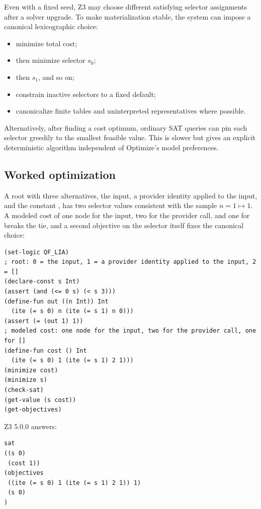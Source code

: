 \documentclass[10pt,letterpaper,oneside]{report}
\newcommand{\code}[1]{\texttt{\detokenize{#1}}}
\begin{document}
Even with a fixed seed, Z3 may choose different satisfying selector assignments after a solver upgrade. To make materialization stable, the system can impose a canonical lexicographic choice:

\begin{itemize}
\item minimize total cost;
\item then minimize selector $s_0$;
\item then $s_1$, and so on;
\item constrain inactive selectors to a fixed default;
\item canonicalize finite tables and uninterpreted representatives where possible.
\end{itemize}

Alternatively, after finding a cost optimum, ordinary SAT queries can pin each selector greedily to the smallest feasible value. This is slower but gives an explicit deterministic algorithm independent of Optimize's model preferences.
\subsection*{Worked optimization}
\label{sec:opt-worked}

A root with three alternatives, the input, a provider identity applied to the input, and the constant \code{[]}, has two selector values consistent with the sample $n=1\mapsto1$. A modeled cost of one node for the input, two for the provider call, and one for \code{[]} breaks the tie, and a second objective on the selector itself fixes the canonical choice:

\begin{lstlisting}[language=SMTLib,caption={Native Optimize with two lexicographic objectives.}]
(set-logic QF_LIA)
; root: 0 = the input, 1 = a provider identity applied to the input, 2 = []
(declare-const s Int)
(assert (and (<= 0 s) (< s 3)))
(define-fun out ((n Int)) Int
  (ite (= s 0) n (ite (= s 1) n 0)))
(assert (= (out 1) 1))
; modeled cost: one node for the input, two for the provider call, one for []
(define-fun cost () Int
  (ite (= s 0) 1 (ite (= s 1) 2 1)))
(minimize cost)
(minimize s)
(check-sat)
(get-value (s cost))
(get-objectives)
\end{lstlisting}

Z3 5.0.0 answers:

\begin{lstlisting}[language=SMTLib]
sat
((s 0)
 (cost 1))
(objectives
 ((ite (= s 0) 1 (ite (= s 1) 2 1)) 1)
 (s 0)
)
\end{lstlisting}
\end{document}
